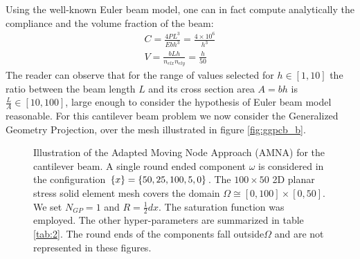 Using the well-known Euler beam model, one can in fact compute analytically the compliance and the volume fraction of the beam:
\begin{eqnarray}
C=\frac{4PL^3}{Ebh^3}=\frac{4\times 10^6}{h^3}\\
V=\frac{bLh}{n_{elx}n_{ely}}=\frac{h}{50}
\end{eqnarray}
The reader can observe that for the range of values selected for $h\in[1,10]$ the ratio between the beam length $L$ and its cross section area $A=bh$ is $\frac{L}{A}\in[10,100]$, large enough to consider the hypothesis of Euler beam model reasonable.
For this cantilever beam problem we now consider the Generalized Geometry Projection, over the mesh illustrated in figure \ref{fig:ggpcb_b}.
\begin{figure}[!ht]
\centering
    \caption{Illustration of the Adapted Moving Node Approach (AMNA)  for the cantilever beam. A single round ended component $\omega$ is considered in the configuration $\left\{{x}\right\}=\left\{{50,25,100,5,0}\right\}$. The $100\times 50$ 2D planar stress solid element mesh covers the domain $\Omega\cong  [0,100] \times [0,50]$. We set $N_{GP}=1$ and $R=\frac{1}{2}dx$. The saturation function was employed. The other hyper-parameters are summarized in table \ref{tab:2}. The round ends of the components fall outside$\Omega$ and are not represented in these figures. }%
    \label{fig:ggpcb}%
\end{figure}
